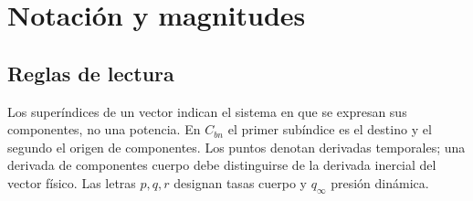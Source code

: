 \appendix
\renewcommand{\thechapter}{\ifcase\value{chapter}\or A\or B\or C\or D\or E\or F\or G\or H\or I\or J\or K\or L\or M\or N\or O\or P\or Q\or R\fi}
\chapter{Notación y magnitudes}
\section{Reglas de lectura}
Los superíndices de un vector indican el sistema en que se expresan sus componentes, no una potencia. En $C_{bn}$ el primer subíndice es el destino y el segundo el origen de componentes. Los puntos denotan derivadas temporales; una derivada de componentes cuerpo debe distinguirse de la derivada inercial del vector físico. Las letras $p,q,r$ designan tasas cuerpo y $q_\infty$ presión dinámica.

